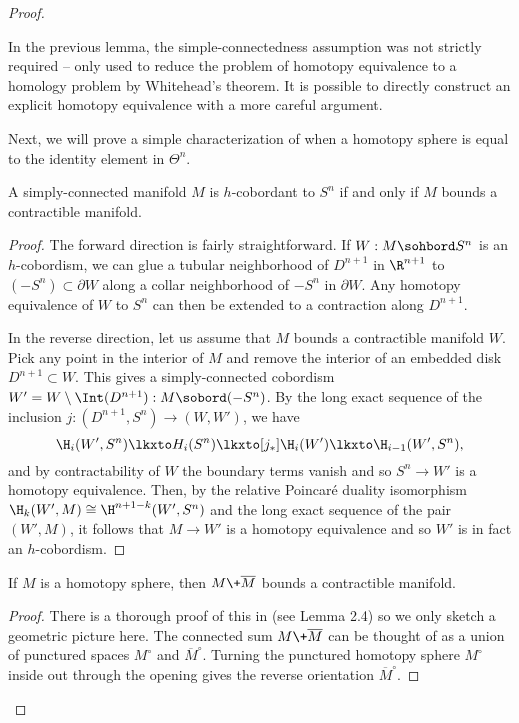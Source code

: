 \begin{proof}
	\begin{remark}
		In the previous lemma, the simple-connectedness assumption was not strictly required -- only used to reduce the problem of homotopy equivalence to a homology problem by Whitehead's theorem. It is possible to directly construct an explicit homotopy equivalence with a more careful argument.
	\end{remark}

	Next, we will prove a simple characterization of when a homotopy sphere is equal to the identity element in $\Theta^n$.

	\begin{lemma}\label{lemma:null-h-cobordant-iff-bounds-contractible}
		A simply-connected manifold $M$ is $h$-cobordant to $S^n$ if and only if $M$ bounds a contractible manifold.
	\end{lemma}
	\begin{proof}
		The forward direction is fairly straightforward. If $W : M\sohbord S^n$ is an $h$-cobordism, we can glue a tubular neighborhood of $D^{n+1}$ in $\R^{n+1}$ to $(-S^n)\subset \partial W$ along a collar neighborhood of $-S^n$ in $\partial W$. Any homotopy equivalence of $W$ to $S^n$ can then be extended to a contraction along $D^{n+1}$.

		In the reverse direction, let us assume that $M$ bounds a contractible manifold $W$. Pick any point in the interior of $M$ and remove the interior of an embedded disk $D^{n+1}\subset W$. This gives a simply-connected cobordism $W'=W\setminus \Int(D^{n+1}) : M\sobord (-S^n)$. By the long exact sequence of the inclusion $j : (D^{n+1}, S^n) \to (W,W')$, we have
		\[
			\H_i(W', S^n) \lkxto H_i(S^n)\lkxto[j_*] \H_i(W')\lkxto \H_{i-1}(W',S^n),
		\]
		and by contractability of $W$ the boundary terms vanish and so $S^n \to W'$ is a homotopy equivalence. Then, by the relative Poincar\'e duality isomorphism $\H_k(W',M)\cong \H^{n+1-k}(W', S^n)$ and the long exact sequence of the pair $(W',M)$, it follows that $M\to W'$ is a homotopy equivalence and so $W'$ is in fact an $h$-cobordism. 
	\end{proof}

	\begin{lemma}
		If $M$ is a homotopy sphere, then $M\+\overline{M}$ bounds a contractible manifold.
	\end{lemma}
	\begin{proof}
		There is a thorough proof of this in \cite{milnorkervaire1963groups} (see Lemma 2.4) so we only sketch a geometric picture here. The connected sum $M\+\overline{M}$ can be thought of as a union of punctured spaces $M^\circ$ and $\overline{M}^\circ$. Turning the punctured homotopy sphere $M^\circ$ inside out through the opening gives the reverse orientation $\overline{M}^\circ$.


\end{proof}
\end{proof}
